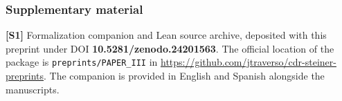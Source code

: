 \documentclass[english,11pt,a4paper]{article}
\begin{document}
\subsubsection{Supplementary material}\label{supplementary-material}

\textbf{{[}S1{]}} Formalization companion and Lean source archive, deposited with this preprint under DOI \textbf{10.5281/zenodo.24201563}. The official location of the package is \texttt{preprints/\allowbreak{}PAPER\_\allowbreak{}III} in \url{https://github.com/jtraverso/cdr-steiner-preprints}. The companion is provided in English and Spanish alongside the manuscripts.

\endgroup
\end{document}
